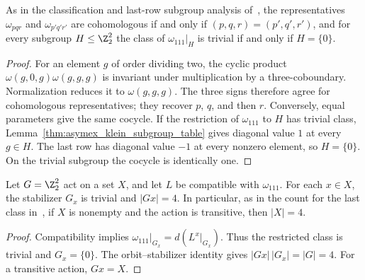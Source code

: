 \begin{lemma}
    \label{thm:asymex_klein_distinct_classes}
    \leanok
    As in the classification and last-row subgroup analysis
    of~\cite[Section~6]{GarreRubio2023MPOSym}, the representatives
    $\omega_{pqr}$ and $\omega_{p'q'r'}$ are cohomologous if and only if
    $(p,q,r)=(p',q',r')$, and for every subgroup $H\leq\Z_2^2$ the class of
    $\omega_{111}|_H$ is trivial if and only if $H=\{0\}$.
\end{lemma}
\begin{proof}
    \leanok
    For an element $g$ of order dividing two, the cyclic product
    $\omega(g,0,g)\omega(g,g,g)$ is invariant under multiplication by a
    three-coboundary. Normalization reduces it to $\omega(g,g,g)$.
    The three signs therefore agree for cohomologous representatives;
    they recover $p$, $q$, and then $r$. Conversely, equal parameters give
    the same cocycle. If the restriction of $\omega_{111}$ to $H$ has
    trivial class, Lemma~\ref{thm:asymex_klein_subgroup_table} gives
    diagonal value $1$ at every $g\in H$.
    The last row has diagonal value $-1$ at every nonzero element, so
    $H=\{0\}$. On the trivial subgroup the cocycle is identically one.
\end{proof}

\begin{lemma}
    \label{thm:asymex_klein_four_blocks}
    \leanok
    Let $G=\Z_2^2$ act on a set $X$, and let $L$ be compatible with
    $\omega_{111}$. For each $x\in X$, the stabilizer $G_x$ is trivial
    and $|Gx|=4$. In particular, as in the count for the last class
    in~\cite[Section~6]{GarreRubio2023MPOSym}, if $X$ is nonempty and the
    action is transitive, then $|X|=4$.
\end{lemma}
\begin{proof}
    \leanok
    Compatibility implies $\omega_{111}|_{G_x}=d(L^x|_{G_x})$.
    Thus the restricted class is trivial and $G_x=\{0\}$.
    The orbit--stabilizer identity gives $|Gx|\,|G_x|=|G|=4$.
    For a transitive action, $Gx=X$.
\end{proof}

